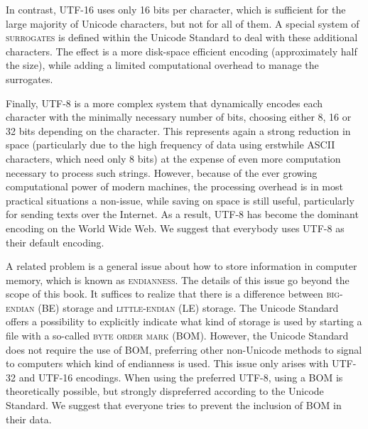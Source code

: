 In contrast, \textsc{UTF-16} uses only 16 bits per character, which is
sufficient for the large majority of Unicode characters, but not for all of
them. A special system of \textsc{surrogates} is defined within the Unicode
Standard to deal with these additional characters. The effect is a more
disk-space efficient encoding (approximately half the size), while adding a
limited computational overhead to manage the surrogates. 

Finally, \textsc{UTF-8} is a more complex system that dynamically encodes each
character with the minimally necessary number of bits, choosing either 8, 16 or
32 bits depending on the character. This represents again a strong reduction in
space (particularly due to the high frequency of data using erstwhile ASCII
characters, which need only 8 bits) at the expense of even more computation
necessary to process such strings. However, because of the ever growing
computational power of modern machines, the processing overhead is in most
practical situations a non-issue, while saving on space is still useful,
particularly for sending texts over the Internet. As a result, UTF-8 has become
the dominant encoding on the World Wide Web. We suggest that everybody uses
UTF-8 as their default encoding.

A related problem is a general issue about how to store information in computer
memory, which is known as \textsc{endianness}. The details of this issue go
beyond the scope of this book. It suffices to realize that there is a difference
between \textsc{big-endian} (BE) storage and \textsc{little-endian} (LE)
storage. The Unicode Standard offers a possibility to explicitly indicate what
kind of storage is used by starting a file with a so-called \textsc{byte order
mark} (BOM). However, the Unicode Standard does not require the use of BOM,
preferring other non-Unicode methods to signal to computers which kind of
endianness is used. This issue only arises with UTF-32 and UTF-16 encodings.
When using the preferred UTF-8, using a BOM is theoretically possible, but
strongly dispreferred according to the Unicode Standard. We suggest that
everyone tries to prevent the inclusion of BOM in their data.




